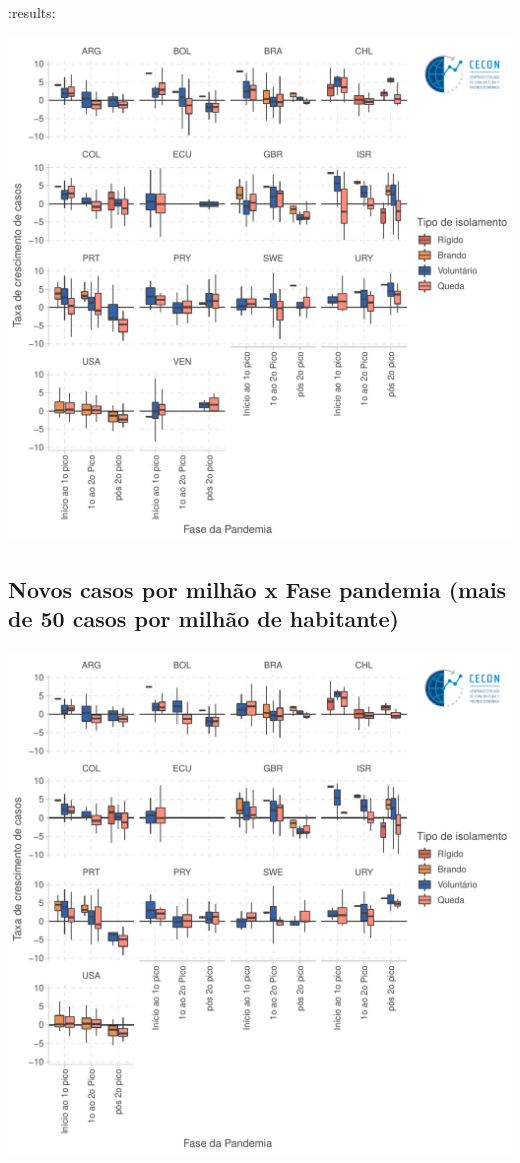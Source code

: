 \documentclass{SelfArx}
\begin{document}
:results:
\begin{center}
\includegraphics[width=.9\linewidth]{./figs/COVID/Casos_Policy_10_Todos.pdf}
\end{center}
\subsection*{Novos casos por milhão x Fase pandemia (mais de 50 casos por milhão de habitante)}
\label{sec:org8cffe46}

\begin{center}
\includegraphics[width=.9\linewidth]{./figs/COVID/Casos_Policy_50_Todos.pdf}
\end{center}
\end{document}
